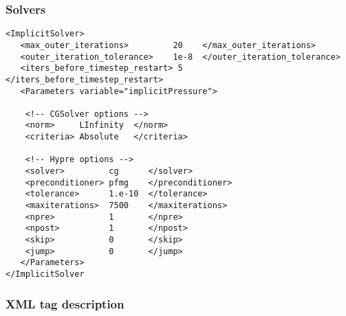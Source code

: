 \subsubsection{Solvers}
\footnotesize
\begin{verbatim}
<ImplicitSolver>
   <max_outer_iterations>         20    </max_outer_iterations>
   <outer_iteration_tolerance>    1e-8  </outer_iteration_tolerance>
   <iters_before_timestep_restart> 5    </iters_before_timestep_restart>
   <Parameters variable="implicitPressure">

    <!-- CGSolver options -->
    <norm>     LInfinity  </norm>
    <criteria> Absolute   </criteria>

    <!-- Hypre options -->
    <solver>         cg      </solver>
    <preconditioner> pfmg    </preconditioner>
    <tolerance>      1.e-10  </tolerance>
    <maxiterations>  7500    </maxiterations>
    <npre>           1       </npre>
    <npost>          1       </npost>
    <skip>           0       </skip>
    <jump>           0       </jump>
   </Parameters>
</ImplicitSolver
\end{verbatim}
\normalfont
\subsubsection{XML tag description}




